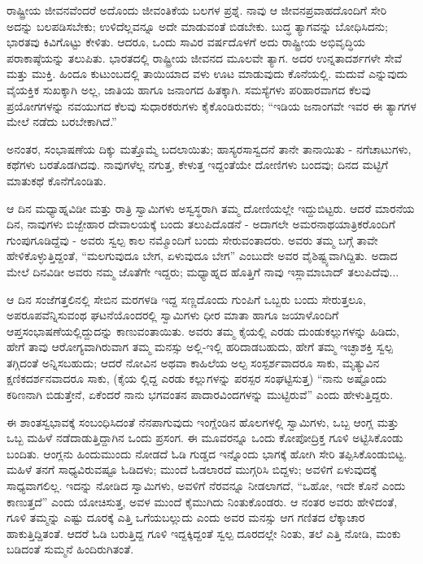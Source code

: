 ರಾಷ್ಟ್ರೀಯ ಜೀವನವೆಂದರೆ ಅದೊಂದು ಜೀವಂತಿಕೆಯ ಬಲಗಳ ಪ್ರಶ್ನೆ. ನಾವು ಆ ಜೀವನಪ್ರವಾಹದೊಂದಿಗೆ ಸೇರಿ ಅದನ್ನು ಬಲಪಡಿಸಬೇಕು; ಉಳಿದೆಲ್ಲವನ್ನೂ ಅದೇ ಮಾಡುವಂತೆ ಬಿಡಬೇಕು. ಬುದ್ಧ ತ್ಯಾಗವನ್ನು ಬೋಧಿಸಿದನು; ಭಾರತವು ಕಿವಿಗೊಟ್ಟು ಕೇಳಿತು. ಆದರೂ, ಒಂದು ಸಾವಿರ ವರ್ಷದೊಳಗೆ ಅದು ರಾಷ್ಟ್ರೀಯ ಅಭಿವೃದ್ಧಿಯ ಪರಾಕಾಷ್ಠೆಯನ್ನು ತಲುಪಿತು. ಭಾರತದಲ್ಲಿ ರಾಷ್ಟ್ರೀಯ ಜೀವನದ ಮೂಲವೇ ತ್ಯಾಗ. ಅದರ ಉನ್ನತಾದರ್ಶಗಳೇ ಸೇವೆ ಮತ್ತು ಮುಕ್ತಿ. ಹಿಂದೂ ಕುಟುಂಬದಲ್ಲಿ ತಾಯಿಯಾದ ವಳು ಊಟ ಮಾಡುವುದು ಕೊನೆಯಲ್ಲಿ. ಮದುವೆ ಎನ್ನುವುದು ವೈಯಕ್ತಿಕ ಸುಖಕ್ಕಾಗಿ ಅಲ್ಲ, ಜಾತಿಯ ಹಾಗೂ ಜನಾಂಗದ ಹಿತಕ್ಕಾಗಿ. ಸಮಸ್ಯೆಗಳು ಪರಿಹಾರವಾಗದ ಕೆಲವು ಪ್ರಯೋಗಗಳನ್ನು ನವಯುಗದ ಕೆಲವು ಸುಧಾರಕರುಗಳು ಕೈಕೊಂಡಿರುವರು; “ಇಡಿಯ ಜನಾಂಗವೇ ಇವರ ಈ ತ್ಯಾಗಗಳ ಮೇಲೆ ನಡೆದು ಬರಬೇಕಾಗಿದೆ.”

ಅನಂತರ, ಸಂಭಾಷಣೆಯ ದಿಕ್ಕು ಮತ್ತೊಮ್ಮೆ ಬದಲಾಯಿತು; ಹಾಸ್ಯರಸಾಸ್ವದನೆ ತಾನೇ ತಾನಾಯಿತು - ನಗೆಚಾಟುಗಳು, ಕಥೆಗಳು ಬರತೊಡಗಿದವು. ನಾವುಗಳೆಲ್ಲ ನಗುತ್ತ, ಕೇಳುತ್ತ ಇದ್ದಂತೆಯೇ ದೋಣಿಗಳು ಬಂದವು; ದಿನದ ಮಟ್ಟಿಗೆ ಮಾತುಕಥೆ ಕೊನೆಗೊಂಡಿತು.

ಆ ದಿನ ಮಧ್ಯಾಹ್ನವಿಡೀ ಮತ್ತು ರಾತ್ರಿ ಸ್ವಾಮಿಗಳು ಅಸ್ವಸ್ಥರಾಗಿ ತಮ್ಮ ದೋಣಿಯಲ್ಲೇ ಇದ್ದುಬಿಟ್ಟರು. ಆದರೆ ಮಾರನೆಯ ದಿನ, ನಾವುಗಳು ಬಿಜ್ಬೇಹಾರ ದೇವಾಲಯಕ್ಕೆ ಬಂದು ತಲುಪಿದೊಡನೆ - ಅದಾಗಲೇ ಅಮರನಾಥಯಾತ್ರಿಕರೊಂದಿಗೆ ಗುಂಪುಗೂಡಿದ್ದೆವು - ಅವರು ಸ್ವಲ್ಪ ಕಾಲ ನಮ್ಮೊಂದಿಗೆ ಬಂದು ಸೇರುವಂತಾದರು. ಅವರು ತಮ್ಮ ಬಗ್ಗೆ ತಾವೇ ಹೇಳಿಕೊಳ್ಳುತ್ತಿದ್ದಂತೆ, “ಮಲಗುವುದೂ ಬೇಗ, ಏಳುವುದೂ ಬೇಗ” ಎಂಬುದೇ ಅವರ ವೈಶಿಷ್ಟ್ಯವಾಗಿದ್ದಿತು. ಅದಾದ ಮೇಲೆ ದಿನವಿಡೀ ಅವರು ನಮ್ಮ ಜೊತೆಗೇ ಇದ್ದರು; ಮಧ್ಯಾಹ್ನದ ಹೊತ್ತಿಗೆ ನಾವು ಇಸ್ಲಾಮಾಬಾದ್ ತಲುಪಿದೆವು...

ಆ ದಿನ ಸಂಜೆಗತ್ತಲಿನಲ್ಲಿ ಸೇಬಿನ ಮರಗಳಡಿ ಇದ್ದ ಸಣ್ಣದೊಂದು ಗುಂಪಿಗೆ ಒಬ್ಬರು ಬಂದು ಸೇರುತ್ತಲೂ, ಅಪರೂಪವೆನ್ನಿಸುವಂಥ ಘಟನೆಯೊಂದರಲ್ಲಿ ಸ್ವಾಮಿಗಳು ಧೀರ ಮಾತಾ ಹಾಗೂ ಜಯಾಳೊಂದಿಗೆ ಆಪ್ತಸಂಭಾಷಣೆಯಲ್ಲಿದ್ದುದನ್ನು ಕಾಣುವಂತಾಯಿತು. ಅವರು ತಮ್ಮ ಕೈಯಲ್ಲಿ ಎರಡು ದುಂಡುಕಲ್ಲುಗಳನ್ನು ಹಿಡಿದು, ಹೇಗೆ ತಾವು ಆರೋಗ್ಯವಾಗಿರುವಾಗ ತಮ್ಮ ಮನಸ್ಸು ಅಲ್ಲಿ-ಇಲ್ಲಿ ಹರಿದಾಡಬಹುದು, ಹೇಗೆ ತಮ್ಮ ಇಚ್ಛಾಶಕ್ತಿ ಸ್ವಲ್ಪ ತಗ್ಗಿದಂತೆ ಅನ್ನಿಸಬಹುದು; ಆದರೆ ನೋವಿನ ಅಥವಾ ಕಾಹಿಲೆಯ ಅಲ್ಪ ಸಂಸ್ಪರ್ಶವಾದರೂ ಸಾಕು, ಮೃತ್ಯುವಿನ ಕ್ಷಣಿಕದರ್ಶನವಾದರೂ ಸಾಕು, (ಕೈಯ ಲ್ಲಿದ್ದ ಎರಡು ಕಲ್ಲುಗಳನ್ನು ಪರಸ್ಪರ ಸಂಘಟ್ಟಿಸುತ್ತ) “ನಾನು ಅಷ್ಟೊಂದು ಕಠಿಣನಾಗಿ ಬಿಡುತ್ತೇನೆ, ಏಕೆಂದರೆ ನಾನು ಭಗವಂತನ ಪಾದಾರವಿಂದಗಳನ್ನು ಮುಟ್ಟಿರುವೆ” ಎಂದು ಹೇಳುತ್ತಿದ್ದರು.

ಈ ಶಾಂತಸ್ವಭಾವಕ್ಕೆ ಸಂಬಂಧಿಸಿದಂತೆ ನೆನಪಾಗುವುದು ಇಂಗ್ಲೆಂಡಿನ ಹೊಲಗಳಲ್ಲಿ ಸ್ವಾಮಿಗಳು, ಒಬ್ಬ ಆಂಗ್ಲ ಮತ್ತು ಒಬ್ಬ ಮಹಿಳೆ ನಡೆದಾಡುತ್ತಿದ್ದಾಗಿನ ಒಂದು ಪ್ರಸಂಗ. ಈ ಮೂವರನ್ನೂ ಒಂದು ಕೋಪೋದ್ರಿಕ್ತ ಗೂಳಿ ಅಟ್ಟಿಸಿಕೊಂಡು ಬಂದಿತು. ಆಂಗ್ಲನು ಹಿಂದುಮುಂದು ನೋಡದೆ ಓಡಿ ಗುಡ್ಡದ ಇನ್ನೊಂದು ಭಾಗಕ್ಕೆ ಹೋಗಿ ಸೇರಿ ತಪ್ಪಿಸಿಕೊಂಡುಬಿಟ್ಟ. ಮಹಿಳೆ ತನಗೆ ಸಾಧ್ಯವಿರುವಷ್ಟೂ ಓಡಿದಳು; ಮುಂದೆ ಓಡಲಾರದೆ ಮುಗ್ಗರಿಸಿ ಬಿದ್ದಳು; ಅವಳಿಗೆ ಏಳುವುದಕ್ಕೆ ಸಾಧ್ಯವಾಗಲಿಲ್ಲ. ಇದನ್ನು ನೋಡಿದ ಸ್ವಾಮಿಗಳು, ಅವಳಿಗೆ ನೆರವನ್ನೂ ನೀಡಲಾಗದೆ, “ಒಹೋ, ಇದೇ ಕೊನೆ ಎಂದು ಕಾಣುತ್ತದೆ” ಎಂದು ಯೋಚಿಸುತ್ತ, ಅವಳ ಮುಂದೆ ಕೈಮುಗಿದು ನಿಂತುಕೊಂಡರು. ಆ ನಂತರ ಅವರು ಹೇಳಿದಂತೆ, ಗೂಳಿ ತಮ್ಮನ್ನು ಎಷ್ಟು ದೂರಕ್ಕೆ ಎತ್ತಿ ಒಗೆಯಬಲ್ಲುದು ಎಂದು ಅವರ ಮನಸ್ಸು ಆಗ ಗಣಿತದ ಲೆಕ್ಕಾಚಾರ ಹಾಕುತ್ತಿದ್ದಿತಂತೆ. ಆದರೆ ಓಡಿ ಬರುತ್ತಿದ್ದ ಗೂಳಿ ಇದ್ದಕ್ಕಿದ್ದಂತೆ ಸ್ವಲ್ಪ ದೂರದಲ್ಲೇ ನಿಂತು, ತಲೆ ಎತ್ತಿ ನೋಡಿ, ಮಂಕು ಬಡಿದಂತೆ ಸುಮ್ಮನೆ ಹಿಂದಿರುಗಿತಂತೆ.


